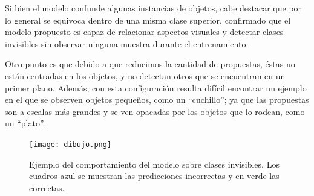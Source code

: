 Si bien el modelo confunde algunas instancias de objetos, cabe destacar que por lo general se equivoca dentro de una misma clase superior, confirmado que el modelo propuesto es capaz de relacionar aspectos visuales y detectar clases invisibles sin observar ninguna muestra durante el entrenamiento. 

Otro punto es que debido a que reducimos la cantidad de propuestas, éstas no están centradas en los objetos, y no detectan otros que se encuentran en un primer plano. Además, con esta configuración resulta difícil encontrar un ejemplo en el que se observen objetos pequeños, como  un ``cuchillo''; ya que las propuestas son a escalas más grandes y se ven opacadas por los objetos que lo rodean, como un ``plato''.

\begin{figure}[]
	\texttt{[image: dibujo.png]}
	\caption{Ejemplo del comportamiento del modelo sobre clases invisibles. Los cuadros azul se muestran las predicciones incorrectas y en verde las correctas.}
	\label{fig:ejmeplosModelo}
\end{figure}